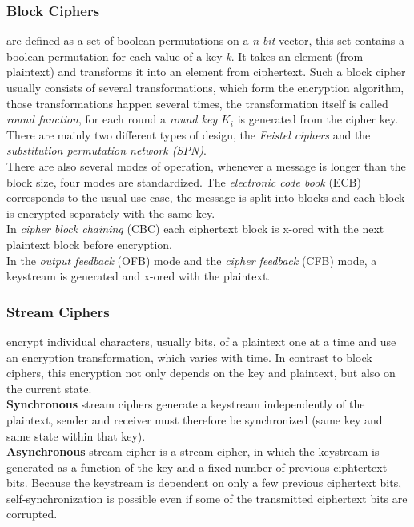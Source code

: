 \documentclass[a4paper, 10 pt, conference]{ieeeconf}
\begin{document}
\vspace{0.5cm}

\subsubsection{\textbf{Block Ciphers}}
are defined as a set of boolean permutations on a \emph{n-bit} vector, this set contains a boolean permutation for each value of a key \emph{k}. 
It takes an element (from plaintext) and transforms it into an element from ciphertext.
Such a block cipher usually consists of several transformations, which form the encryption algorithm, those transformations happen several times, the transformation itself is called \emph{round function}, for each round a \emph{round key} $K_i$ is generated from the cipher key. 
There are mainly two different types of design, the \emph{Feistel ciphers} and the \emph{substitution permutation network (SPN)}. \\
There are also several modes of operation, whenever a message is longer than the block size, four modes are standardized. 
The \emph{electronic code book} (ECB) corresponds to the usual use case, the message is split into blocks and each block is encrypted separately with the same key. \\
In \emph{cipher block chaining} (CBC) each ciphertext block is x-ored with the next plaintext block before encryption. \\
In the \emph{output feedback} (OFB) mode and the \emph{cipher feedback} (CFB) mode, a keystream is generated and x-ored with the plaintext.

\subsubsection{\textbf{Stream Ciphers}} 
encrypt individual characters, usually bits, of a plaintext one at a time and use an encryption transformation, which varies with time. 
In contrast to block ciphers, this encryption not only depends on the key and plaintext, but also on the current state. \\
\textbf{Synchronous} stream ciphers generate a keystream independently of the plaintext, sender and receiver must therefore be synchronized (same key and same state within that key). \\
\textbf{Asynchronous} stream cipher is a stream cipher, in which the keystream is generated as a function of the key and a fixed number of previous ciphtertext bits. 
Because the keystream is dependent on only a few previous ciphertext bits, self-synchronization is possible even if some of the transmitted ciphertext bits are corrupted. 
\end{document}
